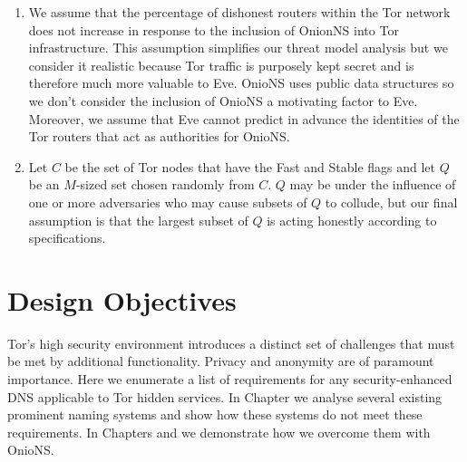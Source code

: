 \begin{enumerate}
	\item We assume that the percentage of dishonest routers within the Tor network does not increase in response to the inclusion of OnionNS into Tor infrastructure. This assumption simplifies our threat model analysis but we consider it realistic because Tor traffic is purposely kept secret and is therefore much more valuable to Eve. OnioNS uses public data structures so we don't consider the inclusion of OnioNS a motivating factor to Eve. Moreover, we assume that Eve cannot predict in advance the identities of the Tor routers that act as authorities for OnioNS.
	\item Let $ C $ be the set of Tor nodes that have the Fast and Stable flags and let $ Q $ be an $ M $-sized set chosen randomly from $ C $. $ Q $ may be under the influence of one or more adversaries who may cause subsets of $ Q $ to collude, but our final assumption is that the largest subset of $ Q $ is acting honestly according to specifications.
\end{enumerate}

\section{Design Objectives}

Tor's high security environment introduces a distinct set of challenges that must be met by additional functionality. Privacy and anonymity are of paramount importance. Here we enumerate a list of requirements for any security-enhanced DNS applicable to Tor hidden services. In Chapter \label{Chapter:ExistingWorks} we analyse several existing prominent naming systems and show how these systems do not meet these requirements. In Chapters \label{Chapter:Solution} and \label{Chapter:Analysis} we demonstrate how we overcome them with OnioNS.

